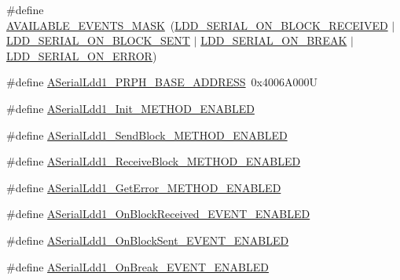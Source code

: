 \begin{DoxyCompactItemize}
\item 
\#define \hyperlink{group___a_serial_ldd1__module_ga5f04a8830cd52a3ffa1678d113f31aee}{A\+V\+A\+I\+L\+A\+B\+L\+E\+\_\+\+E\+V\+E\+N\+T\+S\+\_\+\+M\+A\+SK}~(\hyperlink{group___p_e___types__module_ga1bdfbf78e53d634c2d6c0fac21346a9d}{L\+D\+D\+\_\+\+S\+E\+R\+I\+A\+L\+\_\+\+O\+N\+\_\+\+B\+L\+O\+C\+K\+\_\+\+R\+E\+C\+E\+I\+V\+ED} $\vert$ \hyperlink{group___p_e___types__module_gab32dd0cda62049bd256c1b13d6848ebd}{L\+D\+D\+\_\+\+S\+E\+R\+I\+A\+L\+\_\+\+O\+N\+\_\+\+B\+L\+O\+C\+K\+\_\+\+S\+E\+NT} $\vert$ \hyperlink{group___p_e___types__module_ga5791992a91907e5233a850cd45ea8c21}{L\+D\+D\+\_\+\+S\+E\+R\+I\+A\+L\+\_\+\+O\+N\+\_\+\+B\+R\+E\+AK} $\vert$ \hyperlink{group___p_e___types__module_ga22530c977497afda0f11c86bbf869550}{L\+D\+D\+\_\+\+S\+E\+R\+I\+A\+L\+\_\+\+O\+N\+\_\+\+E\+R\+R\+OR})
\item 
\#define \hyperlink{group___a_serial_ldd1__module_gad9f8e308ce0b459724fa9063778226f3}{A\+Serial\+Ldd1\+\_\+\+P\+R\+P\+H\+\_\+\+B\+A\+S\+E\+\_\+\+A\+D\+D\+R\+E\+SS}~0x4006\+A000U
\item 
\#define \hyperlink{group___a_serial_ldd1__module_ga84f54fa4124bc3dd49cf50bcc270179e}{A\+Serial\+Ldd1\+\_\+\+Init\+\_\+\+M\+E\+T\+H\+O\+D\+\_\+\+E\+N\+A\+B\+L\+ED}
\item 
\#define \hyperlink{group___a_serial_ldd1__module_ga509640fb9027c94e88c56ac41d695f7b}{A\+Serial\+Ldd1\+\_\+\+Send\+Block\+\_\+\+M\+E\+T\+H\+O\+D\+\_\+\+E\+N\+A\+B\+L\+ED}
\item 
\#define \hyperlink{group___a_serial_ldd1__module_ga1aee05f3a9c0f5ae70acda61f9168dec}{A\+Serial\+Ldd1\+\_\+\+Receive\+Block\+\_\+\+M\+E\+T\+H\+O\+D\+\_\+\+E\+N\+A\+B\+L\+ED}
\item 
\#define \hyperlink{group___a_serial_ldd1__module_gab680be05b2b7c712d928dbd5714e76f3}{A\+Serial\+Ldd1\+\_\+\+Get\+Error\+\_\+\+M\+E\+T\+H\+O\+D\+\_\+\+E\+N\+A\+B\+L\+ED}
\item 
\#define \hyperlink{group___a_serial_ldd1__module_ga72f80f8a03f6e282f98fa48bbace1b26}{A\+Serial\+Ldd1\+\_\+\+On\+Block\+Received\+\_\+\+E\+V\+E\+N\+T\+\_\+\+E\+N\+A\+B\+L\+ED}
\item 
\#define \hyperlink{group___a_serial_ldd1__module_gaa7051315c6d66d9dad5981181abbbb2a}{A\+Serial\+Ldd1\+\_\+\+On\+Block\+Sent\+\_\+\+E\+V\+E\+N\+T\+\_\+\+E\+N\+A\+B\+L\+ED}
\item 
\#define \hyperlink{group___a_serial_ldd1__module_gaa1fbbf5b726d5b064e6f772a364572c8}{A\+Serial\+Ldd1\+\_\+\+On\+Break\+\_\+\+E\+V\+E\+N\+T\+\_\+\+E\+N\+A\+B\+L\+ED}

\end{DoxyCompactItemize}
